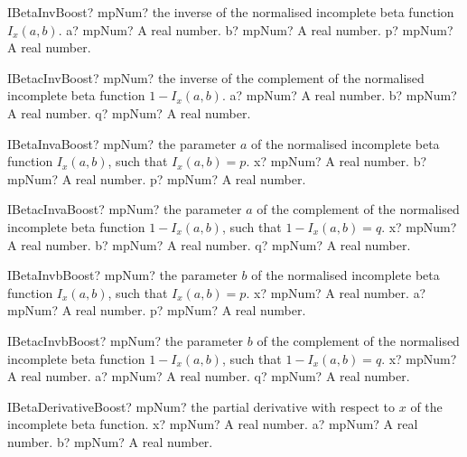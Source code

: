 \documentclass[12pt,a4paper,openany]{book}
\begin{document}
\begin{mpFunctionsExtract}
\mpFunctionThree
{IBetaInvBoost? mpNum? the inverse of the normalised incomplete beta function $I_x(a,b)$.}
{a? mpNum? A real number.}
{b? mpNum? A real number.}
{p? mpNum? A real number.}
\end{mpFunctionsExtract}

\begin{mpFunctionsExtract}
\mpFunctionThree
{IBetacInvBoost? mpNum? the inverse of the complement of the normalised incomplete beta function $1 - I_x(a,b)$.}
{a? mpNum? A real number.}
{b? mpNum? A real number.}
{q? mpNum? A real number.}
\end{mpFunctionsExtract}

\begin{mpFunctionsExtract}
\mpFunctionThree
{IBetaInvaBoost? mpNum? the parameter $a$ of the normalised incomplete beta function $I_x(a,b)$, such that $I_x(a,b) = p$.}
{x? mpNum? A real number.}
{b? mpNum? A real number.}
{p? mpNum? A real number.}
\end{mpFunctionsExtract}

\begin{mpFunctionsExtract}
\mpFunctionThree
{IBetacInvaBoost? mpNum? the parameter $a$ of the complement of the normalised incomplete beta function $1-I_x(a,b)$, such that $1-I_x(a,b) = q$.}
{x? mpNum? A real number.}
{b? mpNum? A real number.}
{q? mpNum? A real number.}
\end{mpFunctionsExtract}

\begin{mpFunctionsExtract}
\mpFunctionThree
{IBetaInvbBoost? mpNum? the parameter $b$ of the normalised incomplete beta function $I_x(a,b)$, such that $I_x(a,b) = p$.}
{x? mpNum? A real number.}
{a? mpNum? A real number.}
{p? mpNum? A real number.}
\end{mpFunctionsExtract}

\begin{mpFunctionsExtract}
\mpFunctionThree
{IBetacInvbBoost? mpNum? the parameter $b$ of the complement of the normalised incomplete beta function $1-I_x(a,b)$, such that $1-I_x(a,b) = q$.}
{x? mpNum? A real number.}
{a? mpNum? A real number.}
{q? mpNum? A real number.}
\end{mpFunctionsExtract}

\begin{mpFunctionsExtract}
\mpFunctionThree
{IBetaDerivativeBoost? mpNum? the partial derivative with respect to $x$ of the incomplete beta function.}
{x? mpNum? A real number.}
{a? mpNum? A real number.}
{b? mpNum? A real number.}
\end{mpFunctionsExtract}
\end{document}
